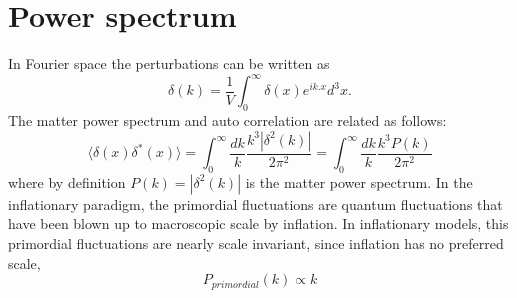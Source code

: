 \section{Power spectrum}
\label{density_ps}
In Fourier space the perturbations can be written as 
\begin{equation}
\delta(k) = \frac{1}{V} \int^{\infty}_{0} \delta(x) e^{ik.x} d^{3}x .
\end{equation}
The matter power spectrum and auto correlation are related as follows:
\begin{equation}
\langle \delta(x) \delta^{*}(x) \rangle = \int^{\infty}_{0} \frac{dk}{k} \frac{k^{3} |\delta^{2}(k)|}{2\pi^{2}} = \int^{\infty}_{0} \frac{dk}{k}\frac{k^{3} P(k)}{2\pi^{2}}
\end{equation}
where by definition $P(k) = |\delta^{2}(k)|$ is the matter power spectrum.
In the inflationary paradigm, the primordial fluctuations are quantum fluctuations that have been blown up to macroscopic scale by inflation. 
In inflationary models, this primordial fluctuations are nearly scale invariant, since inflation has no preferred scale,
\begin{equation}
P_{primordial}(k) \propto k
\end{equation}

